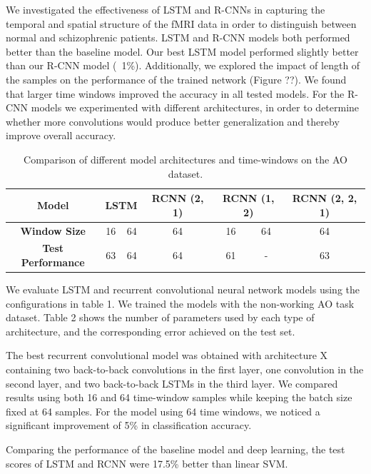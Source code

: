 \documentclass{article}
\begin{document}
We investigated the effectiveness of LSTM and R-CNNs in capturing the temporal and spatial structure of the fMRI data in order to distinguish between normal and schizophrenic patients. LSTM and R-CNN models both performed better than the baseline model. Our best LSTM model performed slightly better than our R-CNN model (~1\%). Additionally, we explored the impact of length of the samples on the performance of the trained network (Figure ??). We found that larger time windows improved the accuracy in all tested models. For the R-CNN models we experimented with different architectures, in order to determine whether more convolutions would produce better generalization and thereby improve overall accuracy. 

\begin{table}[]
\centering
\caption{Comparison of different model architectures and time-windows on the AO dataset.}
\label{table_1}
\begin{tabular}{|c|c|c|c|c|c|c|}
\hline
\textbf{Model}           & \multicolumn{2}{c|}{\textbf{LSTM}} & \textbf{RCNN (2, 1)} & \multicolumn{2}{c|}{\textbf{RCNN (1, 2)}} & \textbf{RCNN (2, 2, 1)} \\ \hline
\textbf{Window Size}      & 16   & 64   & 64    &16    & 64    & 64           \\ \hline
\textbf{Test Performance} & 63   & 64   & 64    & 61      & -           & 63      \\  \hline      
\end{tabular}
\end{table}


We evaluate LSTM and recurrent convolutional neural network models using the configurations in table 1. We trained the models with the non-working AO task dataset. Table 2 shows the number of parameters used by each type of architecture, and the corresponding error achieved on the test set.

The best recurrent convolutional model was obtained with architecture X containing two back-to-back convolutions in the first layer, one convolution in the second layer, and two back-to-back LSTMs in the third layer. We compared results using both 16 and 64 time-window samples while keeping the batch size fixed at 64 samples. For the model using 64 time windows, we noticed a significant improvement of 5\% in classification accuracy.

Comparing the performance of the baseline model and deep learning, the test scores of LSTM and RCNN were 17.5\% better than linear SVM.
\end{document}
